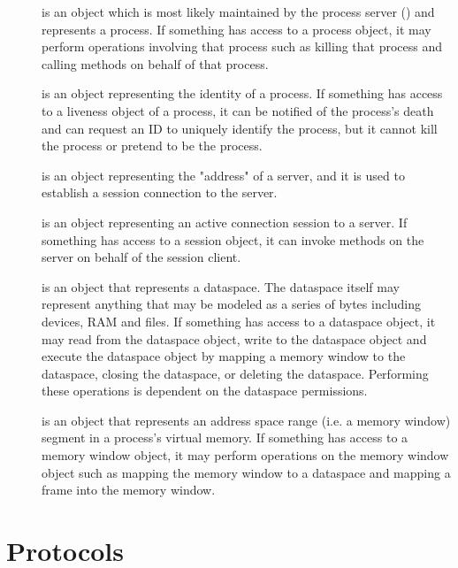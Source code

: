 \begin{description}

	\item[] is an object which is most likely maintained by the process server () and represents a process. If something has access to a process object, it may perform operations involving that process such as killing that process and calling methods on behalf of that process.
      
	\item[] is an object representing the identity of a process. If something has access to a liveness object of a process, it can be notified of the process's death and can request an ID to uniquely identify the process, but it cannot kill the process or pretend to be the process.
       
	\item[] is an object representing the "address" of a server, and it is used to establish a session connection to the server.
    
	\item[] is an object representing an active connection session	to a server. If something has access to a session object, it can invoke methods on the server on behalf of the session client.
    
	\item[] is an object that represents a dataspace. The dataspace itself may represent anything that may be modeled as a series of bytes including devices, RAM and files. If something has access to a dataspace object, it may read from the dataspace object, write to the dataspace object and execute the dataspace object by mapping a memory window to the dataspace, closing the dataspace, or deleting the dataspace. Performing these operations is dependent on the dataspace permissions.
      
	\item[] is an object that represents an address space range (i.e. a memory window) segment in a process's virtual memory. If something has access to a memory window object, it may perform operations on the memory window object such as mapping the memory window to a dataspace and mapping a frame into the memory window.
    
\end{description}

\section{Protocols}
\label{lProtocols}

